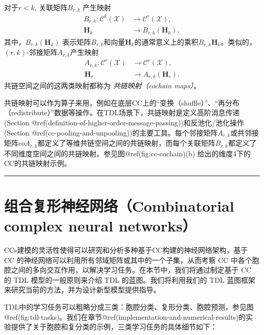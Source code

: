 \documentclass[
  12pt,
]{krantz}
\begin{document}
\label{cochain-maps}
对于\(r< k\), 关联矩阵\(B_{r,k}\) 产生映射 \begin{align*}
B_{r,k}\colon \mathcal{C}^k(\mathcal{X}) &\to   \mathcal{C}^r(\mathcal{X}),\\
\mathbf{H}_k &\to  B_{r,k}(\mathbf{H}_k),
\end{align*} 其中，\(B_{r,k}(\mathbf{H}_k)\)
表示矩阵\(B_{r,k}\)和向量\(\mathbf{H}_k\)的通常意义上的乘积\(B_{r,k}\mathbf{H}_k\)。类似的，\((r,k)\)-邻接矩阵\(A_{r,k}\)产生映射
\begin{align*}
A_{r,k}\colon \mathcal{C}^r(\mathcal{X}) &\to   \mathcal{C}^r(\mathcal{X}),\\
\mathbf{H}_r &\to  A_{r,k}(\mathbf{H}_r).
\end{align*} 共链空间之间的这两类映射都称为 \emph{共链映射（cochain
maps）}。

共链映射可以作为算子来用，例如在底层CC上的``变换（shuffle）''、``再分布（redistribute）''数据等操作。在TDL场景下，共链映射是定义高阶消息传递(Section
@ref(definition-of-higher-order-message-passing))和反池化/池化操作(Section
@ref(cc-pooling-and-unpooling))的主要工具。每个邻接矩阵\(A_{r,k}\)或共邻接矩阵\(coA_{r,k}\)都定义了等维共链空间之间的共链映射，而每个关联矩阵\(B_{r,k}\)都定义了不同维度空间之间的共链映射。参见图@ref(fig:cc-cochain)(b)
给出的维度4下的CC的共链映射示例。

\begin{center}\rule{0.5\linewidth}{0.5pt}\end{center}

\section{组合复形神经网络（Combinatorial complex neural
networks）}\label{combinatorial-complex-neural-networks}

CCs建模的灵活性使得可以研究和分析多种基于CC构建的神经网络架构，基于 CC
的神经网络可以利用所有邻域矩阵或其中的一个子集，从而考察 CC
中各个胞腔之间的多向交互作用，以解决学习任务。在本节中，我们将通过制定基于
CC 的 TDL 模型的一般原则来介绍 TDL 的蓝图。我们将利用我们的 TDL
蓝图框架来研究当前的方法，并为设计新型模型提供指导。

TDL中的学习任务可以粗略分成三类：胞腔分类、复形分类、胞腔预测，参见图@ref(fig:tdl-tasks)。我们在章节@ref(implementation-and-numerical-results)的实验提供了关于胞腔和复分类的示例，三类学习任务的具体细节如下：
\end{document}
